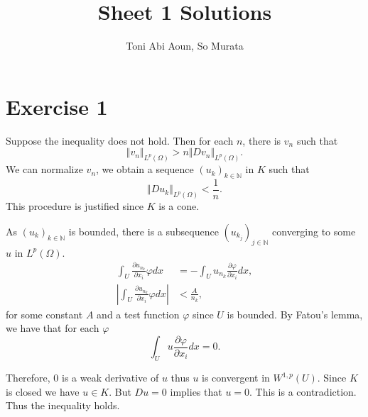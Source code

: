 \documentclass{article}
\title{Sheet 1 Solutions}
\author{Toni Abi Aoun, So Murata}
\date{}
\begin{document}
\maketitle

\section*{Exercise 1}

Suppose the inequality does not hold. Then for each $n$, there is $v_n$ such that
\begin{equation*}
\Vert v_n\Vert_{L^p(\Omega)} > n\Vert Dv_n\Vert_{L^p(\Omega)}.
\end{equation*}
We can normalize $v_n$, we obtain a sequence $(u_k)_{k\in\mathbb{N}}$ in $K$ such that
\begin{equation*}
\Vert Du_k\Vert_{L^p(\Omega)} < {\frac 1 n}.
\end{equation*}
This procedure is justified since $K$ is a cone.\\
\par As $(u_k)_{k\in\mathbb{N}}$ is bounded, there is a subsequence $(u_{k_j})_{j\in\mathbb{N}}$ converging to some $u$ in $L^p(\Omega)$.
\begin{align*}
\int_U {\frac {\partial u_{n_k}} {\partial x_i}}\varphi dx &= -\int_Uu_{n_k}{\frac {\partial \varphi} {\partial x_i}}dx,\\
\left\vert \int_U {\frac {\partial u_{n_k}} {\partial x_i}}\varphi dx\right\vert&<{\frac A {n_k}},
\end{align*}
for some constant $A$ and a test function $\varphi$ since $U$ is bounded. By Fatou's lemma, we have that for each $\varphi$
\begin{equation*}
\int_U u {\frac {\partial\varphi} {\partial x_i}}dx = 0.
\end{equation*}

Therefore, $0$ is a weak derivative of $u$ thus $u$ is convergent in $W^{1,p}(U)$. Since $K$ is closed we have $u\in K$. But $Du=0$ implies that $u=0$. This is a contradiction. Thus the inequality holds.
\end{document}
